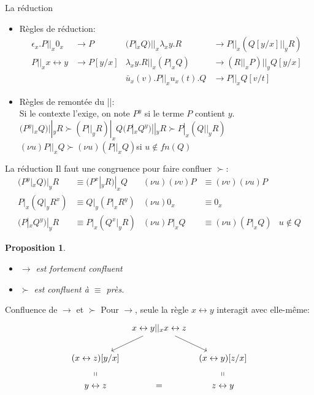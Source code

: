 \documentclass[11pt]{beamer}
\newcommand{\tto}{\leftrightarrow}
\newtheorem{prop}{Proposition}
\begin{document}
\begin{frame}{La réduction}
\begin{itemize}
\item Règles de réduction:
\begin{align*}
\epsilon_x.P ||_x 0_x &\to P & (P|_xQ)||_x\lambda_xy.R &\to P||_x(Q[y/x]||_yR)\\
P||_x x\tto y &\to P[y/x] & \lambda_xy.R||_x(P|_xQ) &\to (R||_xP)||_yQ[y/x]\\
& & \bar{u}_x(v).P||_xu_x(t).Q &\to P||_x Q[v/t]
\end{align*}
\pause\item Règles de remontée du ||:\\
Si le contexte l'exige, on note $P^y$ si le terme $P$ contient $y$.\\
$(P^y|_xQ)||_yR \succ (P||_yR)|_xQ$\hfill$(P|_xQ^y)||_yR \succ P|_x(Q||_yR)$\\
$(\nu u)P||_xQ \succ (\nu u)(P||_xQ)$\hfill si $u\not\in fn(Q)$
\end{itemize}
\end{frame}

\begin{frame}{La réduction}
Il faut une congruence pour faire confluer $\succ$:
\begin{align*}
(P^y|_xQ)|_yR &\equiv (P^x|_yR)|_xQ & (\nu u)(\nu v)P &\equiv (\nu v)(\nu u)P\\
P|_x(Q|_yR^x) &\equiv Q|_y(P|_xR^y) & (\nu u)0_x &\equiv 0_x\\
(P|_xQ^y)|_yR &\equiv P|_x(Q^x|_yR) & (\nu u)P|_xQ &\equiv (\nu u)(P|_xQ) & u\not\in Q
\end{align*}
\begin{prop}
\begin{itemize}
\item $\to$ est fortement confluent
\item $\succ$ est confluent à $\equiv$ près.
\end{itemize}
\end{prop}
\end{frame}

\begin{frame}{Confluence de $\to$ et $\succ$}
Pour $\to$, seule la règle $x \tto y$ interagit avec elle-même:
\[\begin{tikzcd}[ampersand replacement=\&, column sep=tiny]
\& x\tto y ||_x x\tto z \arrow[dl] \arrow[dr] \&\\
(x\tto z)[y/x]\arrow[d, phantom, "\shortparallel"] \& \& (x\tto y)[z/x]\arrow[d, phantom, "\shortparallel"]\\
y\tto z \& = \& z\tto y
\end{tikzcd}\]
\end{frame}
\end{document}
